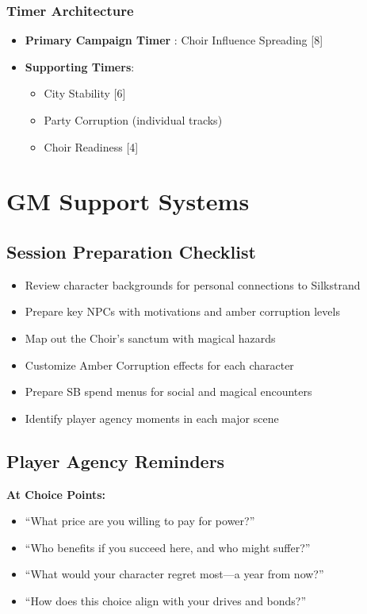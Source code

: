 \documentclass[11pt]{article}
\begin{document}
\subsubsection*{Timer Architecture}

\begin{itemize}
  \item \textbf{Primary Campaign Timer }: Choir Influence Spreading [8]
  \item \textbf{Supporting Timers}:
  \begin{itemize}
    \item City Stability [6]
    \item Party Corruption (individual tracks)
    \item Choir Readiness [4]
  \end{itemize}
\end{itemize}

\section*{GM Support Systems}

\subsection*{Session Preparation Checklist}

\begin{itemize}
  \item[$\square$] Review character backgrounds for personal connections to Silkstrand
  \item[$\square$] Prepare key NPCs with motivations and amber corruption levels
  \item[$\square$] Map out the Choir's sanctum with magical hazards
  \item[$\square$] Customize Amber Corruption effects for each character
  \item[$\square$] Prepare SB spend menus for social and magical encounters
  \item[$\square$] Identify player agency moments in each major scene
\end{itemize}

\subsection*{Player Agency Reminders}

\textbf{At Choice Points:}
\begin{itemize}
  \item ``What price are you willing to pay for power?''
  \item ``Who benefits if you succeed here, and who might suffer?''
  \item ``What would your character regret most---a year from now?''
  \item ``How does this choice align with your drives and bonds?''
\end{itemize}
\end{document}
